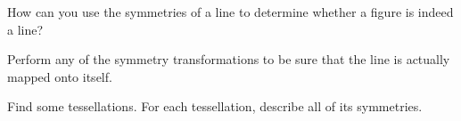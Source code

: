 \documentclass[nooutcomes]{ximera}
\begin{document}
\begin{question}
How can you use the symmetries of a line to determine whether a figure is indeed a line? 
\begin{freeResponse}
\begin{hint}
Perform any of the symmetry transformations to be sure that the line is actually mapped onto itself.  
\end{hint}
\end{freeResponse}
\end{question}

\begin{question}
Find some tessellations.  For each tessellation, describe all of its symmetries.  
\begin{freeResponse}
\begin{hint}
\end{hint}
\end{freeResponse}
\end{question}
\end{document}
